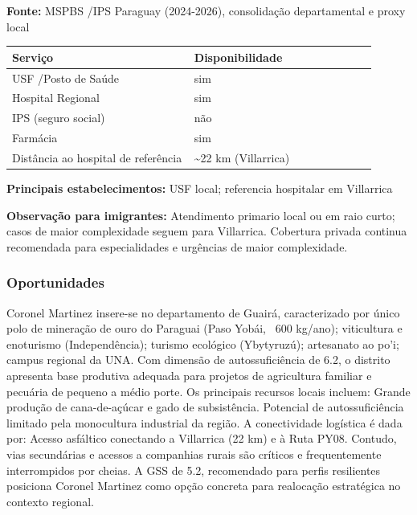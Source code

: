 \textbf{Fonte:} MSPBS /\allowbreak  IPS Paraguay (2024-2026), consolidação
departamental e proxy local

{\def\LTcaptype{none} %
\begin{longtable}{@{}>{\raggedright\arraybackslash}p{0.45\linewidth} >{\raggedright\arraybackslash}p{0.45\linewidth}@{}}
\toprule\noalign{}
Serviço & Disponibilidade \\
\midrule\noalign{}
\endhead
\bottomrule\noalign{}
\endlastfoot
USF /\allowbreak  Posto de Saúde & sim \\
Hospital Regional & sim \\
IPS (seguro social) & não \\
Farmácia & sim \\
Distância ao hospital de referência & \textasciitilde22 km
(Villarrica) \\
\end{longtable}
}

\textbf{Principais estabelecimentos:} USF local; referencia hospitalar
em Villarrica

\textbf{Observação para imigrantes:} Atendimento primario local ou em
raio curto; casos de maior complexidade seguem para Villarrica.
Cobertura privada continua recomendada para especialidades e urgências
de maior complexidade.
\newpage

\subsubsection*{Oportunidades}\label{oport-coronel-martinez-0404}
Coronel Martinez insere-se no departamento de Guairá, caracterizado por único polo de mineração de ouro do Paraguai (Paso Yobái, ~600 kg/ano); viticultura e enoturismo (Independência); turismo ecológico (Ybytyruzú); artesanato ao po'i; campus regional da UNA. Com dimensão de autossuficiência de 6.2, o distrito apresenta base produtiva adequada para projetos de agricultura familiar e pecuária de pequeno a médio porte. Os principais recursos locais incluem: Grande produção de cana-de-açúcar e gado de subsistência. Potencial de autossuficiência limitado pela monocultura industrial da região. A conectividade logística é dada por: Acesso asfáltico conectando a Villarrica (22 km) e à Ruta PY08. Contudo, vias secundárias e acessos a companhias rurais são críticos e frequentemente interrompidos por cheias. A GSS de 5.2, recomendado para perfis resilientes posiciona Coronel Martinez como opção concreta para realocação estratégica no contexto regional.


